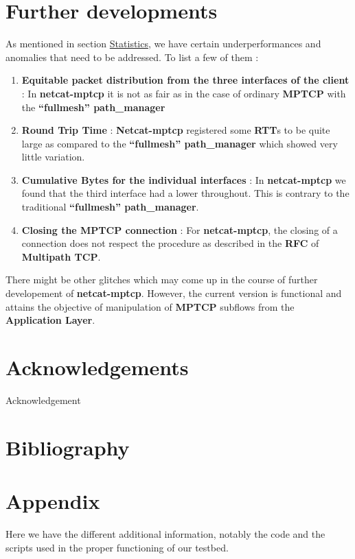 \documentclass[a4paper,11pt]{article}
\begin{document}
		 
	\section{Further developments}
		\label{sec:furtherdevelopment}
		As mentioned in section \hyperref[subsec:statistics]{Statistics}, we have certain underperformances and anomalies that need to be addressed. To list a few of them :

		\begin{enumerate}
			\item \textbf{Equitable packet distribution from the three interfaces of the client} : In \textbf{netcat-mptcp} it is not as fair as in the case of ordinary \textbf{MPTCP} with the \textbf{``fullmesh'' path\_manager}
			\item \textbf{Round Trip Time} : \textbf{Netcat-mptcp} registered some \textbf{RTT}s to be quite large as compared to the \textbf{``fullmesh'' path\_manager} which showed very little variation.
			\item \textbf{Cumulative Bytes for the individual interfaces} : In \textbf{netcat-mptcp} we found that the third interface had a lower throughout. This is contrary to the traditional \textbf{``fullmesh'' path\_manager}.
			\item \textbf{Closing the MPTCP connection} : For \textbf{netcat-mptcp}, the closing of a connection does not respect the procedure as described in the \textbf{RFC} of \textbf{Multipath TCP}.
		\end{enumerate}

		There might be other glitches which may come up in the course of further developement of \textbf{netcat-mptcp}. However, the current version is functional and attains the objective of manipulation of \textbf{MPTCP} subflows from the \textbf{Application Layer}.
			
		 	
		 	
	\clearpage
	\section{Acknowledgements}
	 
	  	Acknowledgement
		 
 	\clearpage
 	\section{Bibliography}
		
		


	\clearpage
	\section{Appendix}
		\label{sec:appendix}
	 	Here we have the different additional information, notably the code and the scripts used in the proper functioning of our testbed.
\end{document}
